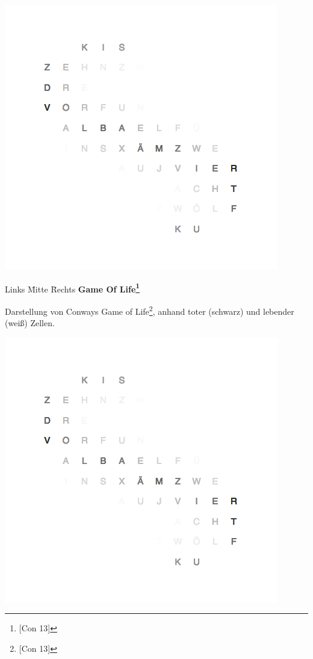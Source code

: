 \begin{multicols}{2}
{
    \centering
    \includegraphics[width=\columnwidth]{Abbildungen/Software/Demo/Helix}
}

\begin{tabbing}  
 Links \= Mitte \= Rechts \kill
 \> \textbf{Game Of Life\footnote{[Con 13]}}
\end{tabbing}


Darstellung von Conways Game of Life\footnote{[Con 13]}, anhand toter (schwarz) und lebender (weiß) Zellen.

{
    \centering
    \includegraphics[width=\columnwidth]{Abbildungen/Software/Demo/Helix}
}


\end{multicols}

